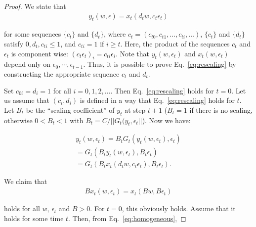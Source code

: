 \documentclass[jair, twoside,11pt,theapa]{article}
\begin{document}
\begin{proof}
We state that 
\begin{equation}\label{eq:rescaling}
    \begin{array}{l}
         y_t(w, \epsilon) = x_t(d_t w, c_t \epsilon_t)
    \end{array}
\end{equation}


\noindent for some sequences $\{c_t\}$ and $\{d_t\}$, where $c_t = (c_{t0}, c_{t1}, \ldots, c_{ti}, \ldots)$, $\{c_t\}$ and $\{d_t\}$ satisfy $0,d_t, c_{ti} \leq 1$, and $c_{ti} = 1$ if $i\geq t$. Here, the product of the sequences $c_t$ and $\epsilon_t$ is component wise: $(c_t \epsilon_t)_i = c_{ti} \epsilon_i$. Note that $y_t(w, \epsilon_t)$ and $x_t(w,\epsilon_t)$ depend only on $\epsilon_0, \cdots, \epsilon_{t-1}$. Thus, it is possible to prove Eq.~\ref{eq:rescaling} by constructing the appropriate sequence $c_t$ and $d_t$. 

Set $c_{0i} = d_i = 1$ for all $i = 0,1,2, \ldots$. Then Eq.~\ref{eq:rescaling} holds for $t=0$. Let us assume that $(c_i, d_i)$ is defined in a way that Eq.~\ref{eq:rescaling} holds for $t$. Let $B_t$ be the ``scaling coefficient'' of $y_t$ at step $t+1$ ($B_t = 1$ if there is no scaling, otherwise $0<B_t<1$ with $B_t = C/||G_t(y_t, \epsilon_t||$). Now we have: 

\begin{equation}
    \begin{array}{l}
         y_t(w, \epsilon_t) = B_t G_t (y_t(w,\epsilon_t), \epsilon_t) \\
         
         = G_t(B_t y_t(w, \epsilon_t), B_t \epsilon_t)\\
         
         = G_t(B_t x_t(d_tw, c_t\epsilon_t), B_t \epsilon_t).
    \end{array}
\end{equation}

We claim that 
\begin{equation}\label{eq:claimforS}
    \begin{array}{l}
         B{x_t} (w, \epsilon_t) = x_t(B w, B \epsilon_t)
    \end{array}
\end{equation}

\noindent holds for all $w$, $\epsilon_t$ and $B>0$. For $t = 0$, this obviously holds. Assume that it holds for some time $t$. Then, from Eq.~\ref{eq:homogeneous},


\end{proof}
\end{document}
